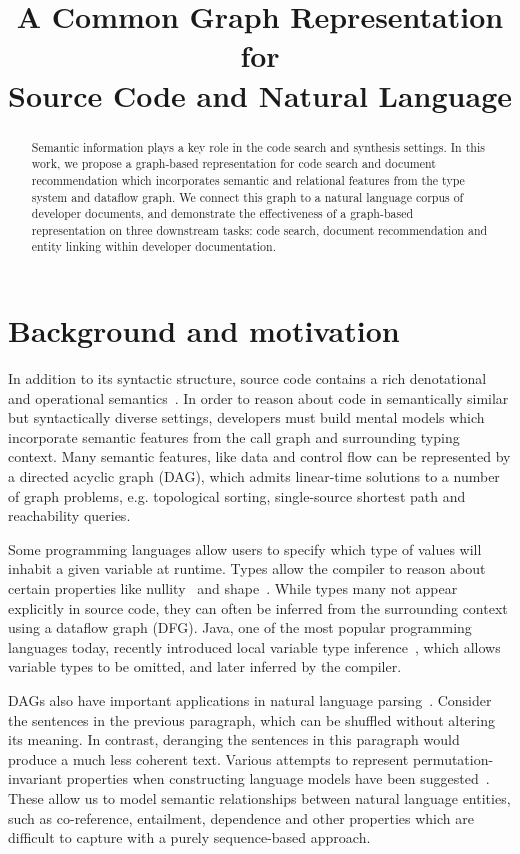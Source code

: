\documentclass{article}
\title{A Common Graph Representation for\\Source Code and Natural Language}
\begin{document}
\maketitle

\begin{abstract}
Semantic information plays a key role in the code search and synthesis settings. In this work, we propose a graph-based representation for code search and document recommendation which incorporates semantic and relational features from the type system and dataflow graph. We connect this graph to a natural language corpus of developer documents, and demonstrate the effectiveness of a graph-based representation on three downstream tasks: code search, document recommendation and entity linking within developer documentation.
\end{abstract}

\section{Background and motivation}

In addition to its syntactic structure, source code contains a rich denotational and operational semantics~\citep{henkel2018code}. In order to reason about code in semantically similar but syntactically diverse settings, developers must build mental models which incorporate semantic features from the call graph and surrounding typing context. Many semantic features, like data and control flow can be represented by a directed acyclic graph (DAG), which admits linear-time solutions to a number of graph problems, e.g. topological sorting, single-source shortest path and reachability queries.

Some programming languages allow users to specify which type of values will inhabit a given variable at runtime. Types allow the compiler to reason about certain properties like nullity~\citep{ekman2007pluggable} and shape~\citep{considine2019kotlingrad}. While types many not appear explicitly in source code, they can often be inferred from the surrounding context using a dataflow graph (DFG). Java, one of the most popular programming languages today, recently introduced local variable type inference~\citet{liddell2019analyzing}, which allows variable types to be omitted, and later inferred by the compiler.

DAGs also have important applications in natural language parsing~\citep{sagae2008shift, quernheim2012dagger}. Consider the sentences in the previous paragraph, which can be shuffled without altering its meaning. In contrast, deranging the sentences in this paragraph would produce a much less coherent text. Various attempts to represent permutation-invariant properties when constructing language models have been suggested~\citep{vinyals2015pointer}. These allow us to model semantic relationships between natural language entities, such as co-reference, entailment, dependence and other properties which are difficult to capture with a purely sequence-based approach.
\end{document}
